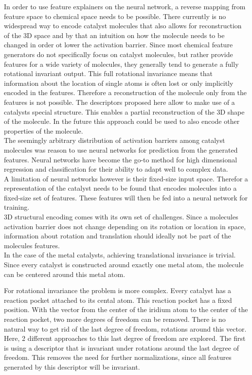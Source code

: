 In order to use feature explainers on the neural network, a reverse mapping from feature space to chemical space needs to be possible.
There currently is no widespread way to encode catalyst molecules that also allows for 
reconstruction of the 3D space and by that an intuition on how the molecule needs to be changed in order ot lower the activation barrier.
Since most chemical feature generators do not specifically focus on catalyst molecules,
but rather provide features for a wide variety of molecules, they generally tend to generate a fully rotational invariant output.
This full rotational invariance means that information about the location of single atoms is often lost or only implicitly encoded in the features.
Therefore a reconstruction of the molecule only from the features is not possible.
The descriptors proposed here allow to make use of a catalysts special structure.
This enables a partial reconstruction of the 3D shape of the molecule.
In the future this approach could be used to also encode other properties of the molecule.
\\

The seemingly arbitrary distribution of activation barriers among catalyst molecules  was reason to use neural networks for prediction from the generated features.
Neural networks have become the go-to method for high dimensional regression and classification for their ability to adapt well to complex data.
\\
A limitation of neural networks however is their fixed-size input space.
Therefor a representation of the catalyst needs to be found that encodes molecules into a fixed-size set of features.
These features will then be fed into a neural network for training. 
\\
3D structural encoding comes with its own set of challenges. 
Since a molecules activation barrier does not change depending on its rotation or location in space, 
information about rotation and translation should ideally not be part of the molecules features.
\\
In the case of the metal catalysts, achieving translational invariance is trivial.
Since every catalyst is constructed around exactly one metal atom, the molecule can be centered around this metal atom.

For rotational invariance the problem is more complex.
Every catalyst has a reaction pocket attached to its cental atom.
This reaction pocket has a fixed position.
With the vector from the center of the iridium atom to the center of the reaction pocket, two more degrees of freedom can be removed.
There is no natural way to get rid of the last degree of freedom, rotations around this vector.
Here, 2 different approaches to this last degree of freedom are explored.
The first is using a descriptor that is invariant under rotations around the last degree of freedom.
This removes the need for further normalizations, since all features generated by this descriptor will be invariant.

